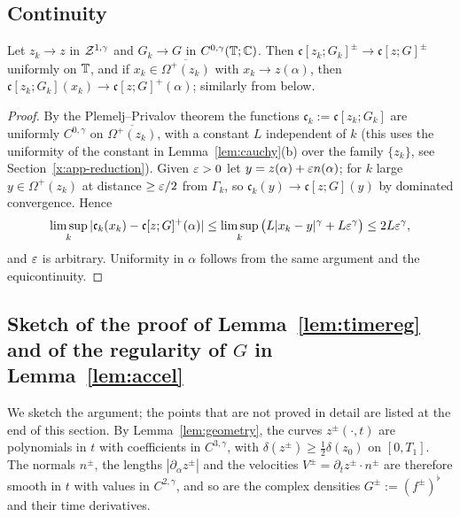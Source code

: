 \subsection{Continuity}
\begin{lemma}\label{lem:continuity}
Let $z_k\to z$ in $\mathcal{Z}^{1,\gamma}$ and $G_k\to G$ in $C^{0,\gamma}(\mathbb{T};\mathbb{C})$. Then $\mathfrak c[z_k;G_k]^\pm\to\mathfrak c[z;G]^\pm$ uniformly on $\mathbb{T}$, and if $x_k\in\overline{\Omega^+(z_k)}$ with $x_k\to z(\alpha)$, then
$\mathfrak c[z_k;G_k](x_k)\to\mathfrak c[z;G]^+(\alpha)$; similarly from below.
\end{lemma}

\begin{proof}
By the Plemelj--Privalov theorem the functions $\mathfrak c_k:=\mathfrak c[z_k;G_k]$ are uniformly $C^{0,\gamma}$ on $\overline{\Omega^+(z_k)}$, with a constant $L$ independent of $k$ (this uses
the uniformity of the constant in Lemma~\ref{lem:cauchy}(b) over the family $\{z_k\}$, see Section~\ref{x:app-reduction}). Given $\varepsilon>0$ let
$y=z(\alpha)+\varepsilon n(\alpha)$; for $k$ large $y\in\Omega^+(z_k)$ at distance $\ge\varepsilon/2$ from $\Gamma_k$, so $\mathfrak c_k(y)\to\mathfrak c[z;G](y)$ by dominated convergence. Hence
\[
\limsup_k|\mathfrak c_k(x_k)-\mathfrak c[z;G]^+(\alpha)|\le\limsup_k\big(L|x_k-y|^\gamma+L\varepsilon^\gamma\big)\le 2L\varepsilon^\gamma,
\]
and $\varepsilon$ is arbitrary. Uniformity in $\alpha$ follows from the same argument and the equicontinuity.
\end{proof}

\subsection{Sketch of the proof of Lemma~\ref{lem:timereg} and of the regularity of $G$ in Lemma~\ref{lem:accel}}\label{x:app-sketch}
We sketch the argument; the points that are not proved in detail are listed at the end of this section. By Lemma~\ref{lem:geometry}, the curves $z^\pm(\cdot,t)$ are polynomials in $t$ with coefficients in $C^{3,\gamma}$, with $\delta(z^\pm)\ge\frac12\delta(z_0)$ on $[0,T_1]$. The normals $n^\pm$, the lengths
$|\partial_\alpha z^\pm|$ and the velocities $V^\pm=\partial_tz^\pm\cdot n^\pm$ are therefore smooth in $t$ with values in $C^{2,\gamma}$, and so are the complex densities $G^\pm:=(f^\pm)^\flat$ and their time
derivatives.


